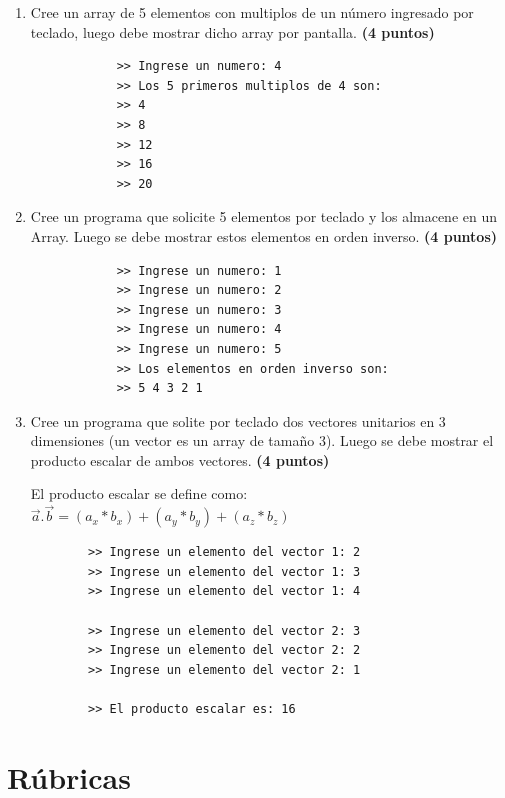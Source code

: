 \documentclass{article}
\begin{document}
	\begin{enumerate}
		\item Cree un array de 5 elementos con multiplos de un número ingresado por teclado, luego debe mostrar dicho array por pantalla.  \textbf{(4 puntos)}			
		
			\begin{lstlisting}
			>> Ingrese un numero: 4
			>> Los 5 primeros multiplos de 4 son:
			>> 4
			>> 8
			>> 12
			>> 16
			>> 20
			\end{lstlisting}
			
		\item Cree un programa que solicite 5 elementos por teclado y los almacene en un Array. Luego se debe mostrar estos elementos en orden inverso. \textbf{(4 puntos)}	 		
		
			\begin{lstlisting}
			>> Ingrese un numero: 1
			>> Ingrese un numero: 2
			>> Ingrese un numero: 3
			>> Ingrese un numero: 4
			>> Ingrese un numero: 5
			>> Los elementos en orden inverso son:
			>> 5 4 3 2 1
			\end{lstlisting}
			
		\item Cree un programa que solite por teclado dos vectores unitarios en 3 dimensiones (un vector es un array de tamaño 3). Luego se debe mostrar el producto escalar de ambos vectores.   \textbf{(4 puntos)}
		
		El producto escalar se define como: $ \overrightarrow{a}.\overrightarrow{b} = ( a_x * b_x ) + ( a_y * b_y )  + ( a_z * b_z ) $
		
		\begin{lstlisting}
		>> Ingrese un elemento del vector 1: 2
		>> Ingrese un elemento del vector 1: 3
		>> Ingrese un elemento del vector 1: 4
		
		>> Ingrese un elemento del vector 2: 3
		>> Ingrese un elemento del vector 2: 2
		>> Ingrese un elemento del vector 2: 1
		
		>> El producto escalar es: 16
		\end{lstlisting}

	\end{enumerate}


	
\clearpage
	\section{Rúbricas}
	
\end{document}
